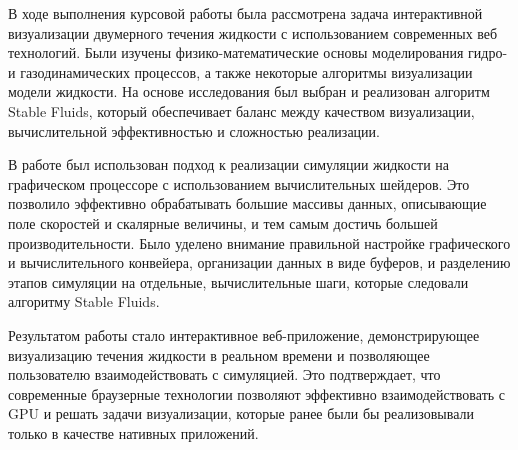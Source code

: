 В ходе выполнения курсовой работы была рассмотрена задача интерактивной визуализации двумерного течения жидкости с использованием современных веб технологий. Были изучены физико-математические основы моделирования гидро- и газодинамических процессов, а также некоторые алгоритмы визуализации модели жидкости. На основе исследования был выбран и реализован алгоритм Stable Fluids, который обеспечивает баланс между качеством визуализации, вычислительной эффективностью и сложностью реализации.


В работе был использован подход к реализации симуляции жидкости на графическом процессоре с использованием вычислительных шейдеров. Это позволило эффективно обрабатывать большие массивы данных, описывающие поле скоростей и скалярные величины, и тем самым достичь большей производительности. Было уделено внимание правильной настройке графического и вычислительного конвейера, организации данных в виде буферов, и разделению этапов симуляции на отдельные, вычислительные шаги, которые следовали алгоритму Stable Fluids.


Результатом работы стало интерактивное веб-приложение, демонстрирующее визуализацию течения жидкости в реальном времени и позволяющее пользователю взаимодействовать с симуляцией. Это подтверждает, что современные браузерные технологии позволяют эффективно взаимодействовать с GPU и решать задачи визуализации, которые ранее были бы реализовывали только в качестве нативных приложений.

